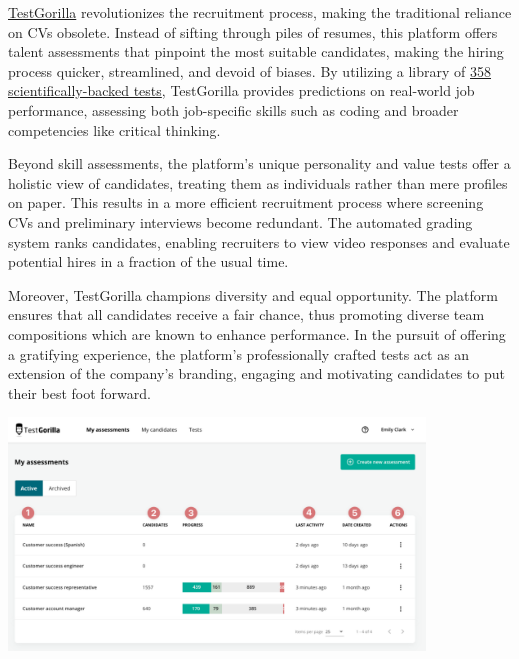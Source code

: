 \documentclass[
]{book}
\begin{document}
\href{https://www.testgorilla.com/?utm_term=testgorilla\&utm_campaign=TestGorilla+\%7C+Branded+I+SKAG+AdGroups+\%7C+US\&utm_source=google\&utm_medium=cpc\&hsa_acc=4932434860\&hsa_cam=12598017525\&hsa_grp=118410898783\&hsa_ad=537212466646\&hsa_src=g\&hsa_tgt=kwd-927907651583\&hsa_kw=testgorilla\&hsa_mt=e\&hsa_net=adwords\&hsa_ver=3\&gclid=CjwKCAjw5_GmBhBIEiwA5QSMxLAMrdiiKyGt8ZjFz4BL_vP1ktTPpNCugXM2c48T20vqlbD_7lhF1hoCWDEQAvD_BwE}{TestGorilla} revolutionizes the recruitment process, making the traditional reliance on CVs obsolete. Instead of sifting through piles of resumes, this platform offers talent assessments that pinpoint the most suitable candidates, making the hiring process quicker, streamlined, and devoid of biases. By utilizing a library of \href{https://www.testgorilla.com/?utm_term=testgorilla\&utm_campaign=TestGorilla+\%7C+Branded+I+SKAG+AdGroups+\%7C+US\&utm_source=google\&utm_medium=cpc\&hsa_acc=4932434860\&hsa_cam=12598017525\&hsa_grp=118410898783\&hsa_ad=537212466646\&hsa_src=g\&hsa_tgt=kwd-927907651583\&hsa_kw=testgorilla\&hsa_mt=e\&hsa_net=adwords\&hsa_ver=3\&gclid=CjwKCAjw5_GmBhBIEiwA5QSMxLAMrdiiKyGt8ZjFz4BL_vP1ktTPpNCugXM2c48T20vqlbD_7lhF1hoCWDEQAvD_BwE}{358 scientifically-backed tests}, TestGorilla provides predictions on real-world job performance, assessing both job-specific skills such as coding and broader competencies like critical thinking.

Beyond skill assessments, the platform's unique personality and value tests offer a holistic view of candidates, treating them as individuals rather than mere profiles on paper. This results in a more efficient recruitment process where screening CVs and preliminary interviews become redundant. The automated grading system ranks candidates, enabling recruiters to view video responses and evaluate potential hires in a fraction of the usual time.

Moreover, TestGorilla champions diversity and equal opportunity. The platform ensures that all candidates receive a fair chance, thus promoting diverse team compositions which are known to enhance performance. In the pursuit of offering a gratifying experience, the platform's professionally crafted tests act as an extension of the company's branding, engaging and motivating candidates to put their best foot forward.

\includegraphics[width=4.35417in,height=\textheight]{testgorilla pic.png}
\end{document}
